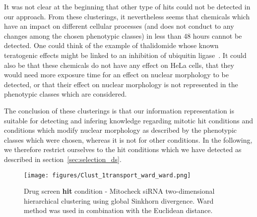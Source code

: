 It was not clear at the beginning that other type of hits could not be detected in our approach. From these clusterings, it nevertheless seems that chemicals which have an impact on different cellular processes (and does not conduct to any changes among the chosen phenotypic classes) in less than 48 hours cannot be detected. One could think of the example of thalidomide whose known teratogenic effects might be linked to an inhibition of ubiquitin ligase~\cite{pmid20223979}. It could also be that these chemicals do not have any effect on HeLa cells, that they would need more exposure time for an effect on nuclear morphology to be detected, or that their effect on nuclear morphology is not represented in the phenotypic classes which are considered.

The conclusion of these clusterings is that our information representation is suitable for detecting and infering knowledge regarding mitotic hit conditions and conditions which modify nuclear morphology as described by the phenotypic classes which were chosen, whereas it is not for other conditions. In the following, we therefore restrict ourselves to the hit conditions which we have detected as described in section~\ref{sec:selection_ds}.
%

\begin{figure*}[ht!]
\centerline{\texttt{[image: figures/Clust\_1transport\_ward\_ward.png]}}
\caption{Drug screen \textbf{hit} condition - Mitocheck siRNA two-dimensional hierarchical clustering using global Sinkhorn divergence. Ward method was used in combination with the Euclidean distance.}
\label{hitcond_clust_transport}
\end{figure*}

